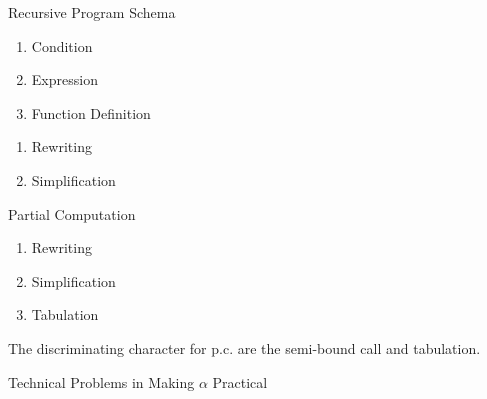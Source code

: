 \documentclass[aspectratio=169,dvipsnames]{beamer}
\begin{document}
\begin{frame}{Recursive Program Schema}
    \begin{enumerate}
        \item Condition
        \item Expression
        \item Function Definition
    \end{enumerate}


    \begin{enumerate}
        \item Rewriting
        \item Simplification
    \end{enumerate}

    Partial Computation

    \begin{enumerate}
        \item Rewriting
        \item Simplification
        \item Tabulation
    \end{enumerate}

    The discriminating character for p.c. are the semi-bound call and tabulation.

\end{frame}

\begin{frame}{Technical Problems in Making $\alpha$ Practical}

\end{frame}

     
\end{document}
